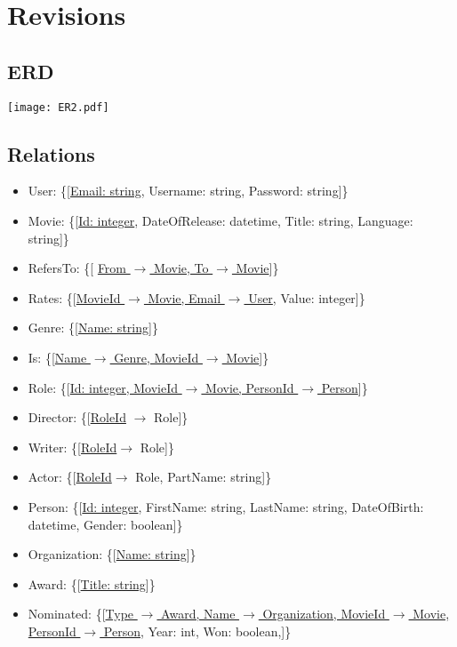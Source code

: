 \section{Revisions}

\subsection{ERD}
\texttt{[image: ER2.pdf]}

\subsection{Relations}
\begin{itemize}
\item User: \{[\underline{Email: string}, Username: string, Password: string]\}

\item Movie: \{[\underline{Id: integer}, DateOfRelease: datetime, Title: string, Language: string]\}

\item RefersTo: \{[ \underline{From $\rightarrow$ Movie, To $\rightarrow$ Movie}]\}

\item Rates: \{[\underline{MovieId $\rightarrow$ Movie, Email $ \rightarrow $ User}, Value: integer]\}

\item Genre: \{[\underline{Name: string}]\}

\item Is: \{[\underline{Name $\rightarrow$ Genre, MovieId $\rightarrow$ Movie}]\}

\item Role: \{[\underline{Id: integer, MovieId $\rightarrow$ Movie, PersonId $ \rightarrow $ Person}]\}

\item Director: \{[\underline{RoleId} $ \rightarrow $ Role]\}

\item Writer: \{[\underline{RoleId}$ \rightarrow $ Role]\}

\item Actor: \{[\underline{RoleId}$ \rightarrow $ Role, PartName: string]\}

\item Person: \{[\underline{Id: integer}, FirstName: string, LastName: string, DateOfBirth: datetime, Gender: boolean]\}

\item Organization: \{[\underline{Name: string}]\}

\item Award: \{[\underline{Title: string}]\}

\item Nominated: \{[\underline{Type $ \rightarrow $ Award, Name $ \rightarrow $ Organization, MovieId $\rightarrow$ Movie,}\\
\underline{PersonId $ \rightarrow $ Person}, Year: int, Won: boolean,]\}
\end{itemize}

